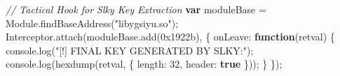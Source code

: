 \documentclass[
]{article}
\newenvironment{Shaded}{}{}
\newcommand{\BaseNTok}[1]{\textcolor[rgb]{0.25,0.63,0.44}{#1}}
\newcommand{\BuiltInTok}[1]{\textcolor[rgb]{0.00,0.50,0.00}{#1}}
\newcommand{\CommentTok}[1]{\textcolor[rgb]{0.38,0.63,0.69}{\textit{#1}}}
\newcommand{\DataTypeTok}[1]{\textcolor[rgb]{0.56,0.13,0.00}{#1}}
\newcommand{\DecValTok}[1]{\textcolor[rgb]{0.25,0.63,0.44}{#1}}
\newcommand{\FunctionTok}[1]{\textcolor[rgb]{0.02,0.16,0.49}{#1}}
\newcommand{\KeywordTok}[1]{\textcolor[rgb]{0.00,0.44,0.13}{\textbf{#1}}}
\newcommand{\NormalTok}[1]{#1}
\newcommand{\OperatorTok}[1]{\textcolor[rgb]{0.40,0.40,0.40}{#1}}
\newcommand{\StringTok}[1]{\textcolor[rgb]{0.25,0.44,0.63}{#1}}
\begin{document}
\begin{Shaded}
\begin{Highlighting}[]
\CommentTok{// Tactical Hook for Slky Key Extraction}
\KeywordTok{var}\NormalTok{ moduleBase }\OperatorTok{=}\NormalTok{ Module}\OperatorTok{.}\FunctionTok{findBaseAddress}\NormalTok{(}\StringTok{"libygsiyu.so"}\NormalTok{)}\OperatorTok{;}
\NormalTok{Interceptor}\OperatorTok{.}\FunctionTok{attach}\NormalTok{(moduleBase}\OperatorTok{.}\FunctionTok{add}\NormalTok{(}\BaseNTok{0x1922b}\NormalTok{)}\OperatorTok{,}\NormalTok{ \{}
    \DataTypeTok{onLeave}\OperatorTok{:} \KeywordTok{function}\NormalTok{(retval) \{}
        \BuiltInTok{console}\OperatorTok{.}\FunctionTok{log}\NormalTok{(}\StringTok{"[!] FINAL KEY GENERATED BY SLKY:"}\NormalTok{)}\OperatorTok{;}
        \BuiltInTok{console}\OperatorTok{.}\FunctionTok{log}\NormalTok{(}\FunctionTok{hexdump}\NormalTok{(retval}\OperatorTok{,}\NormalTok{ \{ }\DataTypeTok{length}\OperatorTok{:} \DecValTok{32}\OperatorTok{,} \DataTypeTok{header}\OperatorTok{:} \KeywordTok{true}\NormalTok{ \}))}\OperatorTok{;}
\NormalTok{    \}}
\NormalTok{\})}\OperatorTok{;}
\end{Highlighting}
\end{Shaded}
\end{document}
